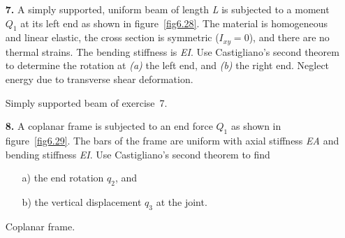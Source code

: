 \documentclass{AeroStructure-ERJohnson}
\begin{document}
\begin{exercise}
\begin{enumerate}[\textbf{2.}]
\item[\textbf{7.}]  A simply supported, uniform beam of length \textit{L} is subjected to a moment $Q_{1}$ at its left end as shown in figure~\ref{fig6.28}. The material is homogeneous and linear elastic, the cross section is symmetric ($I_{x y}=0$), and there are no thermal strains. The bending stiffness is \textit{EI}. Use Castigliano's second theorem to determine the rotation at \textit{(a)} the left end, and \textit{(b)} the right end. Neglect energy due to transverse shear deformation.


{\floataboveskip=-0.6pc
{\caption{Simply supported beam of exercise~7.\label{fig6.28}}}}

\item[\textbf{8.}] A coplanar frame is subjected to an end force $Q_{1}$ as shown in figure~\ref{fig6.29}. The bars of the frame are uniform with axial stiffness \textit{EA} and bending stiffness \textit{EI}. Use Castigliano's second theorem to find
\begin{enumerate}[b)]
\item[{\hskip13pt}a)] the end rotation $q_{2}$, and
\item[{\hskip13pt}b)] the vertical displacement $q_{3}$ at the joint.
\end{enumerate}

{\floataboveskip=-1pc
\floatbelowskip=-0.6pc
{\caption{Coplanar frame.\label{fig6.29}}}}


\end{enumerate}
\end{exercise}
\end{document}
